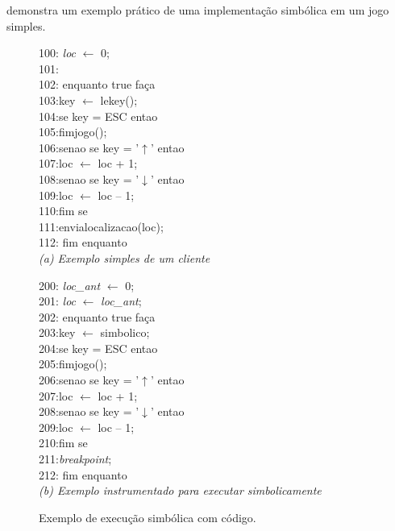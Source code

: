  \cite{implementacaosimbolica} demonstra um exemplo prático de uma implementação simbólica em um jogo simples.


\begin{figure}[h!]
		\small
		\begin{multicols}{2}

		100: \textit{loc} $\leftarrow$ 0; \\
		101: \\
		102: enquanto true faça \\
		103:\tab    key $\leftarrow$ lekey(); \\
		104:\tab	se key = ESC entao \\
		105:\tab\tab		fimjogo(); \\
		106:\tab	senao se key = '$\uparrow$' entao \\
		107:\tab\tab		loc $\leftarrow$  loc + 1; \\
		108:\tab	senao se key = '$\downarrow$' entao \\
		109:\tab\tab		loc $\leftarrow$  loc -- 1; \\
		110:\tab	fim se \\
		111:\tab envialocalizacao(loc); \\
		112: fim enquanto \\

		\footnotesize
		\textit{(a) Exemplo simples de um cliente}

		\small
		200: \textit{loc\_ant} $\leftarrow$ 0; \\
		201: \textit{loc} $\leftarrow$ \textit{loc\_ant}; \\
		202: enquanto true faça \\
		203:\tab	key $\leftarrow$ simbolico; \\
		204:\tab	se key = ESC entao \\
		205:\tab\tab		fimjogo(); \\
		206:\tab	senao se key = '$\uparrow$' entao \\
		207:\tab\tab		loc $\leftarrow$  loc + 1; \\
		208:\tab	senao se key = '$\downarrow$' entao \\
		209:\tab\tab		loc $\leftarrow$  loc -- 1; \\
		210:\tab	fim se \\
		211:\tab	\textit{breakpoint}; \\
		212: fim enquanto \\ 

		\footnotesize
		\textit{(b) Exemplo instrumentado para executar simbolicamente}

		\end{multicols}

	\caption[Exemplo de execução simbólica com código.]{Exemplo de execução simbólica com código.}
	\label{fig:codigo1}	

\end{figure}


